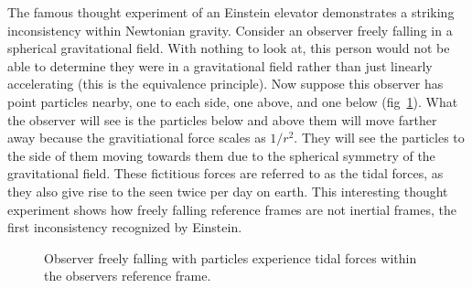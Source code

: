 The famous thought experiment of an Einstein elevator demonstrates a striking inconsistency within Newtonian gravity. Consider an observer freely falling in a spherical gravitational field. With nothing to look at, this person would not be able to determine they were in a gravitational field rather than just linearly accelerating (this is the equivalence principle). Now suppose this observer has point particles nearby, one to each side, one above, and one below (fig~\ref{fig:tidal_forces}). What the observer will see is the particles below and above them will move farther away because the gravitiational force scales as $1/r^2$. They will see the particles to the side of them moving towards them due to the spherical symmetry of the gravitational field. These fictitious forces are referred to as the tidal forces, as they also give rise to the seen twice per day on earth. This interesting thought experiment shows how freely falling reference frames are not inertial frames, the first inconsistency recognized by Einstein. 
\begin{figure}
    \centering
    \caption{Observer freely falling with particles experience tidal forces within the observers reference frame.}
    \label{fig:tidal_forces}
\end{figure}

